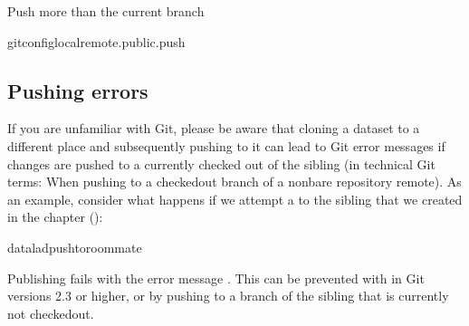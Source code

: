 \begin{findoutmore}[label={fom-push-branch}, before title={\thetcbcounter\ }, float, floatplacement=tb, check odd page=true]{Push more than the current branch}
\begin{sphinxVerbatim}[commandchars=\\\{\}]
gitconfig\PYGZhy{}\PYGZhy{}localremote.public.push
\end{sphinxVerbatim}


\end{findoutmore}


\subsection{Pushing errors}
\label{\detokenize{basics/101-141-push:pushing-errors}}
\sphinxAtStartPar
If you are unfamiliar with Git, please be aware that cloning a dataset to a different place and subsequently pushing to it can lead to Git error messages if changes are pushed to a currently checked out {\hyperref[\detokenize{glossary:term-branch}]{}} of the sibling (in technical Git terms: When pushing to a checked\sphinxhyphen{}out branch of a non\sphinxhyphen{}bare repository remote).
As an example, consider what happens if we attempt a  to the sibling  that we created in the chapter {\hyperref[\detokenize{basics/basics-collaboration:chapter-collaboration}]{}} ():

\begin{sphinxVerbatim}[commandchars=\\\{\}]
dataladpush\PYGZhy{}\PYGZhy{}toroommate
\end{sphinxVerbatim}

\sphinxAtStartPar
Publishing fails with the error message .
This can be prevented with   in Git versions 2.3 or higher, or by pushing to a branch of the sibling that is currently not checked\sphinxhyphen{}out.

